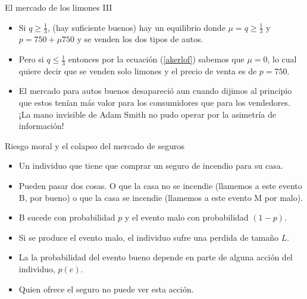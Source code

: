 \documentclass{beamer}
\begin{document}
\begin{frame}{El mercado de los limones III}
\begin{itemize}
\item  Si $ q \geq \frac{1}{3}$, (hay suficiente buenos) hay un equilibrio donde $\mu = q \geq \frac{1}{3}$ y $p= 750 + \mu 750$ y se venden los dos tipos de autos. 

\item Pero si $q \leq \frac{1}{3}$ entonces por la ecuación (\ref{akerlof}) sabemos que $\mu=0 $, lo cual quiere decir que se venden solo limones y el precio de venta es de $p= 750$. 


\item El mercado para autos buenos desapareció aun cuando dijimos al principio que estos tenían más valor para los consumidores que para los vendedores. ¡La mano invisible de Adam Smith no pudo operar por la asimetría de información!

\end{itemize} 
\end{frame}

\begin{frame}{Riesgo moral y el colapso del mercado de seguros}
 \begin{itemize}
     \item Un individuo que tiene que comprar un seguro de incendio para su casa. 
     \item Pueden pasar dos cosas. O que la casa no se incendie (llamemos a este evento B, por bueno) o que la casa se incendie (llamemos a este evento M por malo). 

\item B sucede con probabilidad $p$ y el evento malo con probabilidad $(1-p)$. 
\item Si se produce el evento malo, el individuo sufre una perdida de tamaño $L$.

\item La la probabilidad del evento bueno depende en parte de alguna acción del individuo, $p(e)$.

\item Quien ofrece el seguro no puede ver esta acción. 
\end{itemize}
\end{frame}
\end{document}
